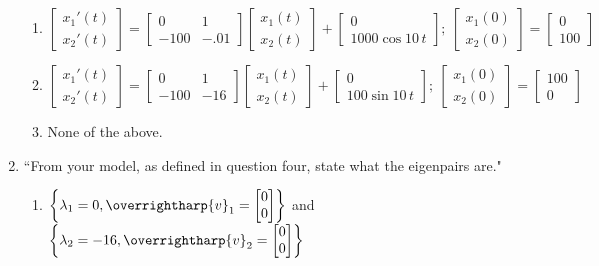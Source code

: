 \documentclass[11pt]{article}
\begin{document}
\begin{enumerate}
\begin{enumerate}
				\item \(\begin{bmatrix} x_{1}'(t) \\ x_{2}'(t) \end{bmatrix}=\begin{bmatrix} 0 & 1 \\ -100 & -.01 \end{bmatrix}\begin{bmatrix} x_{1}(t) \\ x_{2}(t) \end{bmatrix}+\begin{bmatrix} 0 \\ 1000\cos{10\,t} \end{bmatrix};\ \begin{bmatrix} x_{1}(0) \\ x_{2}(0) \end{bmatrix}=\begin{bmatrix} 0 \\ 100 \end{bmatrix}\)

				
				\item \(\begin{bmatrix} x_{1}'(t) \\ x_{2}'(t) \end{bmatrix}=\begin{bmatrix} 0 & 1 \\ -100 & -16 \end{bmatrix}\begin{bmatrix} x_{1}(t) \\ x_{2}(t) \end{bmatrix}+\begin{bmatrix} 0 \\ 100\sin{10\,t} \end{bmatrix};\ \begin{bmatrix} x_{1}(0) \\ x_{2}(0) \end{bmatrix}=\begin{bmatrix} 100 \\ 0 \end{bmatrix}\)
				
				\item None of the above.
			\end{enumerate}
		
		\item ``From your model, as defined in question four, state what the eigenpairs are."
			\begin{enumerate}
				\item \(\left\{\lambda_{1}=0, \overrightharp{v}_1=\begin{bmatrix} 0 \\ 0 \end{bmatrix}\right \}\) and \(\left\{\lambda_{2}=-16, \overrightharp{v}_2=\begin{bmatrix} 0 \\ 0 \end{bmatrix}\right \}\)
				

\end{enumerate}
\end{enumerate}
\end{document}
